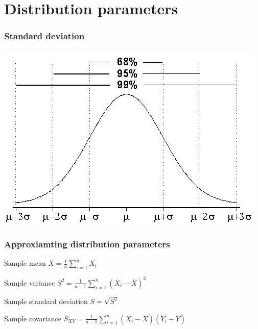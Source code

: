 \documentclass{beamer}
\begin{document}
\section{Distribution parameters}


\begin{frame}
\frametitle{Standard deviation}
\includegraphics[width = \textwidth]{df3.png}
\end{frame}

\begin{frame}
\frametitle{Approxiamting distribution parameters}

\begin{block}{Sample mean}
$ \overline{X} = \frac{1}{n} \sum_{i=1}^n X_i $
\end{block}

\begin{block}{Sample variance}
$ S^2 = \frac{1}{n-1} \sum_{i=1}^n (X_i - \overline{X})^2 $
\end{block}


\begin{block}{Sample standard deviation}
$S = \sqrt{S^2}$
\end{block}

\begin{block}{Sample covariance}
$S_{XY} = \frac{1}{n-1} \sum_{i=1}^n (X_i - \overline{X})(Y_i - \overline{Y}) $
\end{block}
\end{frame}
\end{document}
